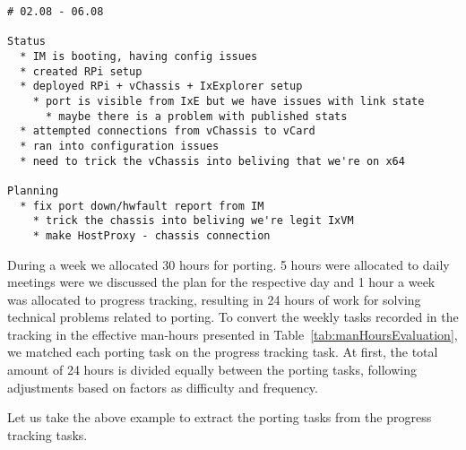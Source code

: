 \begin{verbatim}
# 02.08 - 06.08

Status
  * IM is booting, having config issues
  * created RPi setup
  * deployed RPi + vChassis + IxExplorer setup
    * port is visible from IxE but we have issues with link state
      * maybe there is a problem with published stats
  * attempted connections from vChassis to vCard
  * ran into configuration issues
  * need to trick the vChassis into beliving that we're on x64

Planning
  * fix port down/hwfault report from IM
    * trick the chassis into beliving we're legit IxVM
    * make HostProxy - chassis connection
\end{verbatim}

During a week we allocated 30 hours for porting. 5 hours were allocated to daily
meetings were we discussed the plan for the respective day and 1 hour a week was
allocated to progress tracking, resulting in 24 hours of work for solving
technical problems related to porting. To convert the weekly tasks recorded in
the tracking in the effective man-hours presented
in Table~\ref{tab:manHoursEvaluation}, we matched each porting task on the
progress tracking task. At first, the total amount of 24 hours is divided
equally between the porting tasks, following adjustments based on factors as
difficulty and frequency.

Let us take the above example to extract the porting tasks from the progress
tracking tasks.

